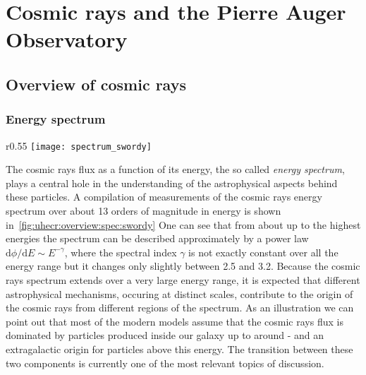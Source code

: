 \chapter{Cosmic rays and the Pierre Auger Observatory}
\label{sec:uhecr}


\cite{Mollerach:2017idb}

\section{Overview of cosmic rays}
\label{sec:uhecr:overview}



\subsection{Energy spectrum}

\begin{wrapfigure}{r}{0.55\textwidth}
  \centering
  \texttt{[image: spectrum\_swordy]}
  \caption{\cite{SwordyPlot2001}}
  \label{fig:uhecr:overview:spec:swordy}
\end{wrapfigure}

The cosmic rays flux as a function of its energy, the so called \emph{energy spectrum},
plays a central hole in the understanding of the astrophysical aspects behind these particles.
A compilation of measurements of the cosmic rays
energy spectrum over about 13 orders of magnitude
in energy is shown in~\cref{fig:uhecr:overview:spec:swordy}
One can see that from about  up to the highest energies
the spectrum can be described approximately 
by a power law $\text{d}\phi/\text{d}E \sim E^{-\gamma}$, where
the spectral index $\gamma$ is not exactly constant over all the energy range
but it changes only slightly between 2.5 and 3.2.
Because the cosmic rays spectrum extends over a very large
energy range, it is expected that different astrophysical mechanisms,
occuring at distinct scales, contribute to the origin
of the cosmic rays from different regions of the spectrum. As an illustration
we can point out that most of the modern models assume that the cosmic rays flux
is dominated by particles produced inside our galaxy up to around - and
an extragalactic origin for particles above this energy. The transition between
these two components is currently one of the most relevant topics of discussion.


